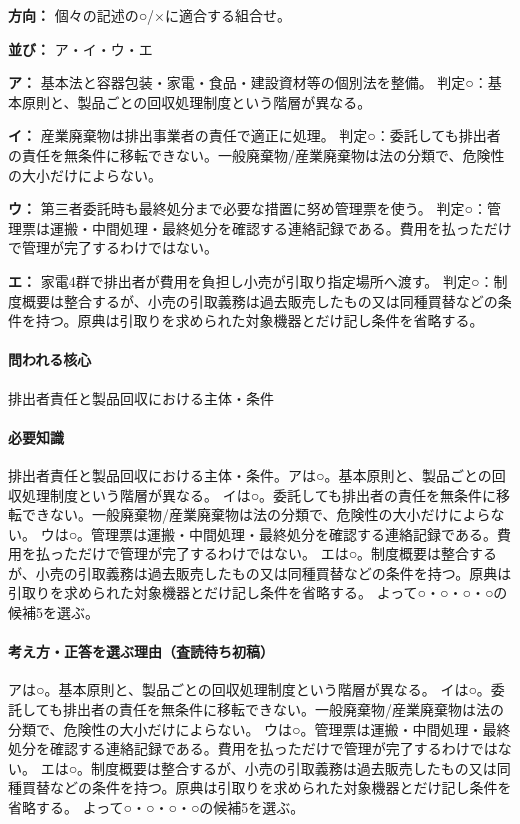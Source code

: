 \noindent\textbf{方向：} 個々の記述の○/×に適合する組合せ。\par

\noindent\textbf{並び：} ア・イ・ウ・エ\par

\noindent\textbf{ア：} 基本法と容器包装・家電・食品・建設資材等の個別法を整備。 判定○：基本原則と、製品ごとの回収処理制度という階層が異なる。\par

\noindent\textbf{イ：} 産業廃棄物は排出事業者の責任で適正に処理。 判定○：委託しても排出者の責任を無条件に移転できない。一般廃棄物/産業廃棄物は法の分類で、危険性の大小だけによらない。\par

\noindent\textbf{ウ：} 第三者委託時も最終処分まで必要な措置に努め管理票を使う。 判定○：管理票は運搬・中間処理・最終処分を確認する連絡記録である。費用を払っただけで管理が完了するわけではない。\par

\noindent\textbf{エ：} 家電4群で排出者が費用を負担し小売が引取り指定場所へ渡す。 判定○：制度概要は整合するが、小売の引取義務は過去販売したもの又は同種買替などの条件を持つ。原典は引取りを求められた対象機器とだけ記し条件を省略する。\par

\paragraph{問われる核心} 排出者責任と製品回収における主体・条件

\paragraph{必要知識} 排出者責任と製品回収における主体・条件。アは○。基本原則と、製品ごとの回収処理制度という階層が異なる。 イは○。委託しても排出者の責任を無条件に移転できない。一般廃棄物/産業廃棄物は法の分類で、危険性の大小だけによらない。 ウは○。管理票は運搬・中間処理・最終処分を確認する連絡記録である。費用を払っただけで管理が完了するわけではない。 エは○。制度概要は整合するが、小売の引取義務は過去販売したもの又は同種買替などの条件を持つ。原典は引取りを求められた対象機器とだけ記し条件を省略する。 よって○・○・○・○の候補5を選ぶ。

\paragraph{考え方・正答を選ぶ理由（査読待ち初稿）} アは○。基本原則と、製品ごとの回収処理制度という階層が異なる。 イは○。委託しても排出者の責任を無条件に移転できない。一般廃棄物/産業廃棄物は法の分類で、危険性の大小だけによらない。 ウは○。管理票は運搬・中間処理・最終処分を確認する連絡記録である。費用を払っただけで管理が完了するわけではない。 エは○。制度概要は整合するが、小売の引取義務は過去販売したもの又は同種買替などの条件を持つ。原典は引取りを求められた対象機器とだけ記し条件を省略する。 よって○・○・○・○の候補5を選ぶ。

